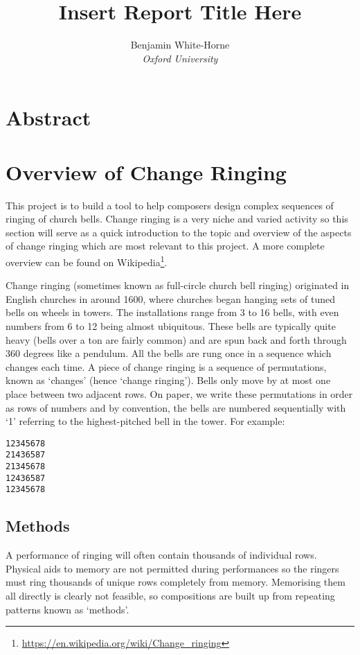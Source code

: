 \documentclass[12pt]{article}
\title{Insert Report Title Here}
\author{Benjamin White-Horne \\ \emph{Oxford University}}
\newcommand{\br}[0]{\vspace{10pt} \noindent}
\newcommand{\footurl}[1]{\footnote{\url{#1}}}
\begin{document}
\maketitle



\pagebreak

\tableofcontents



\pagebreak

\section{Abstract}



\pagebreak

\section{Overview of Change Ringing}

This project is to build a tool to help composers design complex sequences of ringing of church
bells.  Change ringing is a very niche and varied activity so this section will serve as a quick
introduction to the topic and overview of the aspects of change ringing which are most relevant to
this project.  A more complete overview can be found
on Wikipedia\footurl{https://en.wikipedia.org/wiki/Change_ringing}.

\br{}Change ringing (sometimes known as full-circle church bell ringing) originated in English
churches in around 1600, where churches began hanging sets of tuned bells on wheels in towers.
The installations range from 3 to 16 bells, with even numbers from 6 to 12 being almost ubiquitous.
These bells are typically quite heavy (bells over a ton are fairly common) and are spun
back and forth through 360 degrees like a pendulum.  All the bells are rung once in a sequence which
changes each time.  A piece of change ringing is a sequence of permutations, known as `changes'
(hence `change ringing').  Bells only move by at most one place between two adjacent rows.  On
paper, we write these permutations in order as rows of numbers and by convention, the bells
are numbered sequentially with `1' referring to the highest-pitched bell in the tower.  For
example:

\begin{verbatim}
12345678
21436587
21345678
12436587
12345678
\end{verbatim}

\subsection{Methods}
A performance of ringing will often contain thousands of individual rows.  Physical aids to memory
are not permitted during performances so the ringers must ring thousands of unique rows completely
from memory.  Memorising them all directly is clearly not feasible, so compositions are built up
from repeating patterns known as `methods'.
\end{document}
